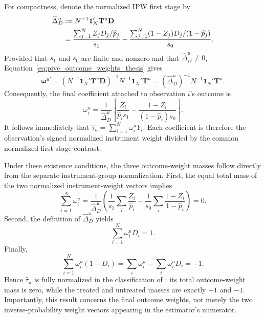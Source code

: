 \documentclass[12pt, a4paper, oneside]{article}
\theoremstyle{plain}
\theoremstyle{definition}
\begin{document}
For compactness, denote the normalized IPW first stage by
\begin{align}
    \widehat\Delta_D^u
    &:=N^{-1}\mathbf 1_N'\mathbf T^u\mathbf D \notag\\
    &=\frac{\sum_{j=1}^{N}Z_jD_j/\widehat p_j}{s_1}
      -\frac{\sum_{j=1}^{N}(1-Z_j)D_j/(1-\widehat p_j)}{s_0}.
    \label{eq:u_delta_scalar}
\end{align}
Provided that \(s_1\) and \(s_0\) are finite and nonzero and that
\(\widehat\Delta_D^u\neq0\), Equation~\eqref{eq:pive_outcome_weights_thesis}
gives
\begin{equation}
    \boldsymbol\omega^{u\prime}
    =\left(N^{-1}\mathbf 1_N'\mathbf T^u\mathbf D\right)^{-1}
      N^{-1}\mathbf 1_N'\mathbf T^u
    =\left(\widehat\Delta_D^u\right)^{-1}
      N^{-1}\mathbf 1_N'\mathbf T^u.
    \label{eq:u_omega_matrix}
\end{equation}
Consequently, the final coefficient attached to observation \(i\)'s outcome is
\begin{equation}
    \boxed{
    \omega_i^u
    =\frac{1}{\widehat\Delta_D^u}
      \left[
        \frac{Z_i}{\widehat p_i s_1}
        -\frac{1-Z_i}{(1-\widehat p_i)s_0}
      \right].}
    \label{eq:u_omega_scalar}
\end{equation}
It follows immediately that
\(\widehat\tau_u=\sum_{i=1}^{N}\omega_i^uY_i\). Each coefficient is therefore the observation's signed normalized instrument
weight divided by the common normalized first-stage contrast.

Under these existence conditions, the three outcome-weight masses follow
directly from the separate instrument-group normalization. First,
the equal total mass of the two normalized instrument-weight vectors implies
\begin{equation}
    \sum_{i=1}^{N}\omega_i^u
    =\frac{1}{\widehat\Delta_D^u}
      \left(\frac{1}{s_1}\sum_i\frac{Z_i}{\widehat p_i}
            -\frac{1}{s_0}\sum_i\frac{1-Z_i}{1-\widehat p_i}\right)
    =0.
    \label{eq:u_omega_sum}
\end{equation}
Second, the definition of \(\widehat\Delta_D^u\) yields
\begin{equation}
    \sum_{i=1}^{N}\omega_i^uD_i=1.
    \label{eq:u_omega_treated_sum}
\end{equation}
Finally,
\begin{equation}
    \sum_{i=1}^{N}\omega_i^u(1-D_i)
    =\sum_i\omega_i^u-\sum_i\omega_i^uD_i=-1.
    \label{eq:u_omega_untreated_sum}
\end{equation}
Hence \(\widehat\tau_u\) is fully normalized in the classification of
\citet{knaus2024treatment}: its total outcome-weight mass is zero, while the
treated and untreated masses are exactly \(+1\) and \(-1\). Importantly, this
result concerns the final outcome weights, not merely the two inverse-probability
weight vectors appearing in the estimator's numerator.
\end{document}
